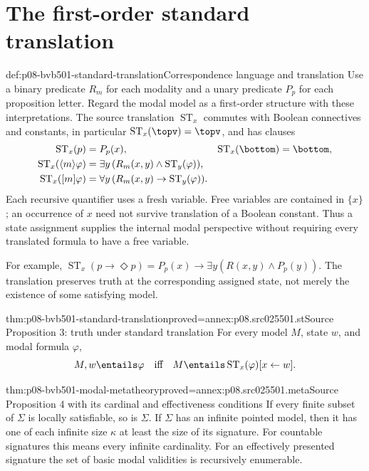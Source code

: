 \section{The first-order standard translation}
\label{sec:p08-bvb501-standard-translation}

\begin{hbdefinition}{def:p08-bvb501-standard-translation}{Correspondence language and translation}
Use a binary predicate \(R_m\) for each modality and a unary predicate
\(P_p\) for each proposition letter. Regard the modal model as a
first-order structure with these interpretations. The source translation
\(\operatorname{ST}_x\) commutes with Boolean connectives and constants,
in particular \(\operatorname{ST}_x(\topv)=\topv\), and has clauses
\[
\begin{aligned}
 \operatorname{ST}_x(p)&=P_p(x),&
 \operatorname{ST}_x(\bottom)&=\bottom,\\
 \operatorname{ST}_x(\langle m\rangle\varphi)
 &=\exists y\,(R_m(x,y)\land\operatorname{ST}_y(\varphi)),\\
 \operatorname{ST}_x([m]\varphi)
 &=\forall y\,(R_m(x,y)\to\operatorname{ST}_y(\varphi)).
\end{aligned}
\]
Each recursive quantifier uses a fresh variable. Free variables are contained
in \(\{x\}\); an occurrence of \(x\) need not survive translation
of a Boolean constant. Thus a state assignment supplies the internal modal
perspective without requiring every translated formula to have a free variable.
\end{hbdefinition}

For example,
\(\operatorname{ST}_x(p\to\Diamond p)=
P_p(x)\to\exists y(R(x,y)\land P_p(y))\).
The translation preserves truth at the corresponding assigned state, not
merely the existence of some satisfying model.

\begin{hbtheorem}{thm:p08-bvb501-standard-translation}{proved=annex:p08.src025501.st}{Source Proposition 3: truth under standard translation}
For every model \(M\), state \(w\), and modal formula \(\varphi\),
\[
 M,w\entails\varphi\quad\text{iff}\quad
 M\entails\operatorname{ST}_x(\varphi)[x\leftarrow w].
\]
\end{hbtheorem}

\begin{hbtheorem}{thm:p08-bvb501-modal-metatheory}{proved=annex:p08.src025501.meta}{Source Proposition 4 with its cardinal and effectiveness conditions}
If every finite subset of \(\Sigma\) is locally satisfiable, so is
\(\Sigma\). If \(\Sigma\) has an infinite pointed model, then it has
one of each infinite size \(\kappa\) at least the size of its signature.
For countable signatures this means every infinite cardinality.
For an effectively presented signature the set of basic modal validities is
recursively enumerable.
\end{hbtheorem}

